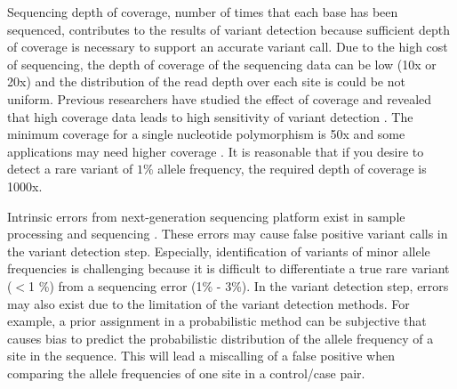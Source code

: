 \documentclass[11pt,reqno]{amsart}
\begin{document}
Sequencing depth of coverage, number of times that each base has been sequenced, contributes to the results of variant detection because sufficient depth of coverage is necessary to support an accurate variant call.
Due to the high cost of sequencing, the depth of coverage of the sequencing data can be low (10x or 20x) and the distribution of the read depth over each site is could be not uniform.
Previous researchers have studied the effect of coverage and revealed that high coverage data leads to high sensitivity of variant detection \citep{neuman2013analysis, krawitz2010microindel}.
The minimum coverage for a single nucleotide polymorphism is 50x and some applications may need higher coverage \citep{Schlotterer2014}.
It is reasonable that if you desire to detect a rare variant of $1 \%$ allele frequency, the required depth of coverage is 1000x.


Intrinsic errors from next-generation sequencing platform exist in sample processing and sequencing \citep{Olson2015}.
These errors may cause false positive variant calls in the variant detection step.
Especially, identification of variants of minor allele frequencies is challenging because it is difficult to differentiate a true rare variant ($<$1 \%) from a sequencing error (1\% - 3\%).
In the variant detection step, errors may also exist due to the limitation of the variant detection methods.
For example, a prior assignment in a probabilistic method can be subjective that causes bias to predict the probabilistic distribution of the allele frequency of a site in the sequence.
This will lead a miscalling of a false positive when comparing the allele frequencies of one site in a control/case pair.

\end{document}
